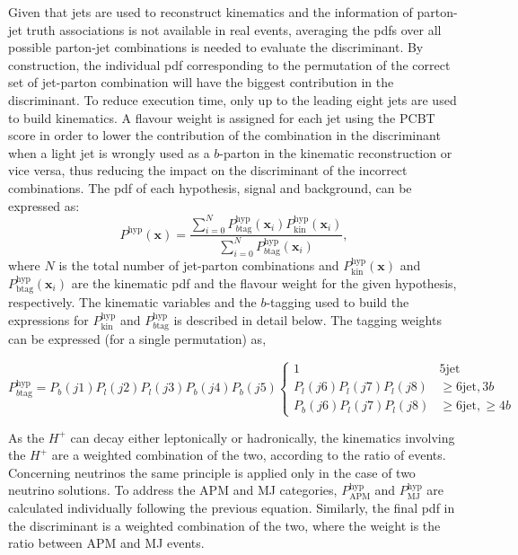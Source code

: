 Given that jets are used to reconstruct kinematics and the information of parton-jet truth associations is not available in real events, averaging the pdfs over all possible parton-jet combinations is needed to evaluate the discriminant. By construction, the individual pdf corresponding to the permutation of the correct set of jet-parton combination will have the biggest contribution in the discriminant. To reduce execution time, only up to the leading eight jets are used to build kinematics. A flavour weight is assigned for each jet using the PCBT score in order to lower the contribution of the combination in the discriminant when a light jet is wrongly used as a $b$-parton in the kinematic reconstruction or vice versa, thus reducing the impact on the discriminant of the incorrect combinations. The pdf of each hypothesis, signal and background, can be expressed as:
\begin{equation}
    P^{\text{hyp}}(\textbf{x})=\frac{\sum_{i=0}^N P^{\text{hyp}}_{b\text{tag}}(\textbf{x}_i)P^{\text{hyp}}_{\text{kin}}(\textbf{x}_i)}{\sum_{i=0}^N P^{\text{hyp}}_{b\text{tag}}(\textbf{x}_i)},
    \label{eq3:PDF}
\end{equation}
where $N$ is the total number of jet-parton combinations and $P^{\text{hyp}}_{\text{kin}}(\textbf{x})$ and $P^{\text{hyp}}_{\text{btag}}(\textbf{x}_i)$ are the kinematic pdf and the flavour weight for the given hypothesis, respectively. The kinematic variables and the $b$-tagging used to build the expressions for $P^{\text{hyp}}_{\text{kin}}$ and $P^{\text{hyp}}_{b\text{tag}}$ is described in detail below. The tagging weights can be expressed (for a single permutation) as,

\begin{equation}
    P^{\text{hyp}}_{b\text{tag}}=P_b(j1)P_l(j2)P_l(j3)P_b(j4)P_b(j5)\begin{cases}1&5\text{jet}\\P_l(j6)P_l(j7)P_l(j8)& \geq6\text{jet},3b\\P_b(j6)P_l(j7)P_l(j8)&\geq6\text{jet},\geq4b\end{cases}
\end{equation}

As the $H^+$ can decay either leptonically or hadronically, the kinematics involving the $H^+$ are a weighted combination of the two, according to the ratio of events. Concerning neutrinos the same principle is applied only in the case of two neutrino solutions. To address the APM and MJ categories, $P^{\text{hyp}}_{\text{APM}}$ and $P^{\text{hyp}}_{\text{MJ}}$ are calculated individually following the previous equation. Similarly, the final pdf in the discriminant is a weighted combination of the two, where the weight is the ratio between APM and MJ events.\\



